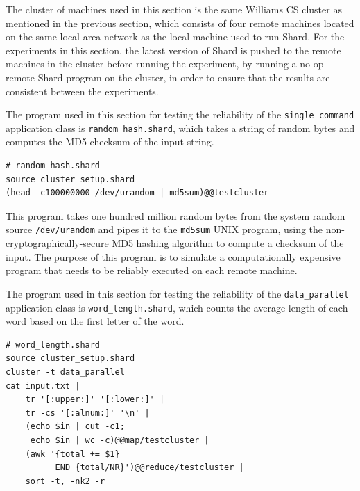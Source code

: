 \documentclass[twoside]{report}
\begin{document}
The cluster of machines used in this section is the same Williams CS cluster as mentioned in the previous section, which consists of four remote machines located on the same local area network as the local machine used to run Shard.
For the experiments in this section, the latest version of Shard is pushed to the remote machines in the cluster before running the experiment, by running a no-op remote Shard program on the cluster, in order to ensure that the results are consistent between the experiments.

The program used in this section for testing the reliability of the \texttt{single\_command} application class is \texttt{random\_hash.shard}, which takes a string of random bytes and computes the MD5 checksum of the input string.

\begin{minipage}[c]{\textwidth-15pt}
  \begin{lstlisting}[language=Shard]
# random_hash.shard
source cluster_setup.shard
(head -c100000000 /dev/urandom | md5sum)@@testcluster
\end{lstlisting}
  \smallskip
\end{minipage}

\begin{sloppypar}
  This program takes one hundred million random bytes from the system random source \texttt{/dev/urandom} and pipes it to the \texttt{md5sum} UNIX program, using the non-cryptographically-secure MD5 hashing algorithm to compute a checksum of the input.
  The purpose of this program is to simulate a computationally expensive program that needs to be reliably executed on each remote machine.
\end{sloppypar}

\begin{sloppypar}
  The program used in this section for testing the reliability of the \texttt{data\_parallel} application class is \texttt{word\_length.shard}, which counts the average length of each word based on the first letter of the word.
\end{sloppypar}

\begin{minipage}[c]{\textwidth-15pt}
  \begin{lstlisting}[language=Shard]
# word_length.shard
source cluster_setup.shard
cluster -t data_parallel
cat input.txt |
    tr '[:upper:]' '[:lower:]' |
    tr -cs '[:alnum:]' '\n' |
    (echo $in | cut -c1;
     echo $in | wc -c)@@map/testcluster |
    (awk '{total += $1}
          END {total/NR}')@@reduce/testcluster |
    sort -t, -nk2 -r
\end{lstlisting}
  \smallskip
\end{minipage}
\end{document}
